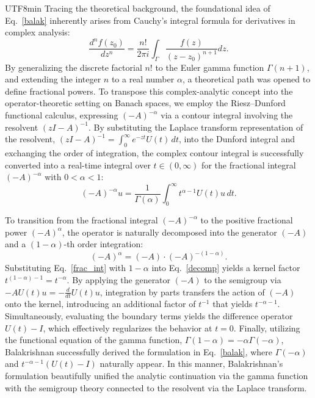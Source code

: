 \documentclass[10pt,a4paper]{article}
\theoremstyle{definition}
\theoremstyle{remark}
\begin{document}
\begin{CJK}{UTF8}{min}
Tracing the theoretical background, the foundational idea of Eq.~\eqref{balak} inherently arises from Cauchy's integral formula for derivatives in complex analysis:
\begin{equation}
\frac{d^n f(z_0)}{dz^n} = \frac{n!}{2 \pi i} \int_{\Gamma} \frac{f(z)}{(z-z_0)^{n+1}} dz.
\end{equation}
By generalizing the discrete factorial $n!$ to the Euler gamma function $\Gamma(n+1)$, and extending the integer $n$ to a real number $\alpha$, a theoretical path was opened to define fractional powers. 
To transpose this complex-analytic concept into the operator-theoretic setting on Banach spaces, we employ the Riesz--Dunford functional calculus, expressing $(-A)^{-\alpha}$ via a contour integral involving the resolvent $(zI - A)^{-1}$. 
By substituting the Laplace transform representation of the resolvent, $(zI - A)^{-1} = \int_0^\infty e^{-zt} U(t) \, dt$, into the Dunford integral and exchanging the order of integration, the complex contour integral is successfully converted into a real-time integral over $t \in (0, \infty)$ for the fractional integral $(-A)^{-\alpha}$ with $0 < \alpha < 1$:
\begin{equation} \label{frac_int}
(-A)^{-\alpha} u = \frac{1}{\Gamma(\alpha)} \int_0^\infty t^{\alpha-1} U(t) u \, dt.
\end{equation}

To transition from the fractional integral $(-A)^{-\alpha}$ to the positive fractional power $(-A)^\alpha$, the operator is naturally decomposed into the generator $(-A)$ and a $(1-\alpha)$-th order integration:
\begin{equation} \label{decomp}
(-A)^\alpha = (-A) \cdot (-A)^{-(1-\alpha)}.
\end{equation}
Substituting Eq.~\eqref{frac_int} with $1-\alpha$ into Eq.~\eqref{decomp} yields a kernel factor $t^{(1-\alpha)-1} = t^{-\alpha}$. 
By applying the generator $(-A)$ to the semigroup via $-A U(t) u = -\frac{d}{dt} U(t) u$, integration by parts transfers the action of $(-A)$ onto the kernel, introducing an additional factor of $t^{-1}$ that yields $t^{-\alpha-1}$. 
Simultaneously, evaluating the boundary terms yields the difference operator $U(t) - I$, which effectively regularizes the behavior at $t = 0$. 
Finally, utilizing the functional equation of the gamma function, $\Gamma(1-\alpha) = -\alpha \Gamma(-\alpha)$, Balakrishnan successfully derived the formulation in Eq.~\eqref{balak}, where $\Gamma(-\alpha)$ and $t^{-\alpha-1}(U(t)-I)$ naturally appear.
In this manner, Balakrishnan's formulation beautifully unified the analytic continuation via the gamma function with the semigroup theory connected to the resolvent via the Laplace transform.


\end{CJK}
\end{document}
